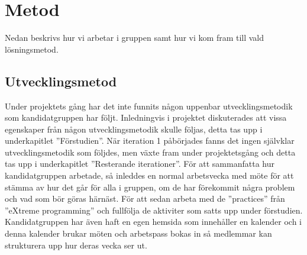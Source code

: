 \section{Metod}
Nedan beskrivs hur vi arbetar i gruppen samt hur vi kom fram till vald lösningsmetod. 

\subsection{Utvecklingsmetod}
Under projektets gång har det inte funnits någon uppenbar utvecklingsmetodik som kandidatgruppen har följt. Inledningvis i projektet diskuterades att vissa egenskaper från någon utvecklingsmetodik skulle följas, detta tas upp i underkapitlet ''Förstudien''. När iteration 1 påbörjades fanns det ingen självklar utvecklingsmetodik som följdes, men växte fram under projektetsgång och detta tas upp i underkapitlet ''Resterande iterationer''.
\newline
\newline
För att sammanfatta hur kandidatgruppen arbetade, så  inleddes en normal arbetsvecka med möte för att stämma av hur det går för alla i gruppen, om de har förekommit några problem och vad som bör göras härnäst. För att sedan arbeta med de ''practices'' från ''eXtreme programming'' och fullfölja de aktiviter som satts upp under förstudien. 
\newline
\newline%
Kandidatgruppen har även haft en egen hemsida som innehåller en kalender och i denna kalender brukar möten och arbetspass bokas in så medlemmar kan strukturera upp hur deras vecka ser ut.


